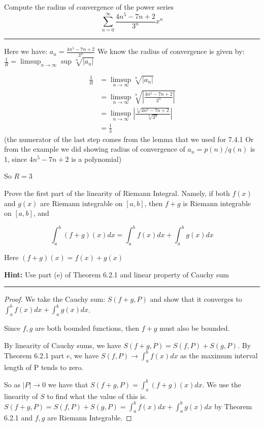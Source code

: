 \documentclass[11pt]{article}
\begin{document}

Compute the radius of convergence of the power series 
$$\sum_{n=0} ^ \infty \frac{4n^5 - 7n + 2}{3^n} x^n$$

\hrule

Here we have: $a_n = \frac{4n^5 - 7n + 2}{3^n}$
We know the radius of convergence is given by: 
$\frac{1}{R} = \limsup_{n \to \infty} \sup \sqrt[n]{|a_n|}$

\begin{align*}
    \frac{1}{R} &= \limsup_{n \to \infty} \sqrt[n]{|a_n|}\\
    &= \limsup_{n \to \infty} \sqrt[n]{\left|\frac{4n^5 - 7n + 2}{3^n}\right|}\\
    &= \limsup_{n \to \infty} \left|\frac{\sqrt[n]{4n^5 - 7n + 2}}{\sqrt[n]{3^n}}\right|\\
    &= \frac{1}{3}
\end{align*}
(the numerator of the last step comes from the lemma that we used for 7.4.1
Or from the example we did showing radius of convergence of $a_n = p(n)/q(n)$ is 1, since $4n^5 -7n +2$ is a polynomial)

So $R = 3$





Prove the first part of the linearity of Riemann Integral. 
Namely, if both $f(x)$ and $g(x)$ are Riemann integrable on $[a,b]$, 
then $f+g$ is Riemann integrable on $[a,b]$, and 

$$\int_a ^b (f + g)(x)dx = \int_a ^b f(x) dx + \int_a ^b g(x) dx$$

Here $(f + g)(x) = f(x) + g(x)$

\textbf{Hint:} Use part (e) of Theorem 6.2.1 and linear property of Cauchy sum


\hrule


\begin{proof}
    We take the Cauchy sum: $S(f+g, P)$ and show that it converges to $\int_a ^b f(x) dx + \int_a ^b g(x) dx$.
    
    Since $f,g$ are both bounded functions, then $f + g$ must also be bounded.

    By linearity of Cauchy sums, we have $S(f+g, P) = S(f, P) + S(g,P)$.
    By Theorem 6.2.1 part $e$, we have $S(f, P) \to \int_a ^b f(x) dx$ as the maximum
    interval length of P tends to zero. 

    So as $|P| \to 0$ we have that $S(f+g, P) = \int_a ^b (f + g)(x)dx$.
    We use the linearity of $S$ to find what the value of this is.
    $S(f+g, P) = S(f, P) + S(g,P) = \int_a ^b f(x) dx + \int_a ^b g(x) dx$
    by Theorem 6.2.1 and $f,g$ are Riemann Integrable.

\end{proof}
\end{document}
